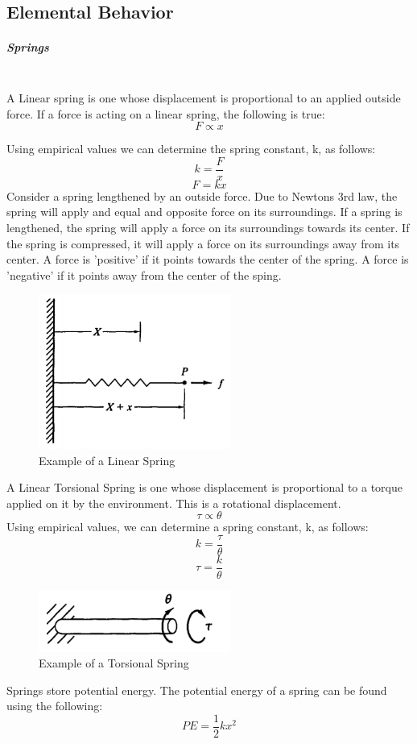 \documentclass[paper=a4, fontsize=11pt]{scrartcl} %
\numberwithin{equation}{section} %
\numberwithin{figure}{section} %
\numberwithin{table}{section} %
\begin{document}
\subsection{Elemental Behavior}

\subparagraph{Springs}~ \\
A Linear spring is one whose displacement is proportional to an applied outside force. If a force is acting on a linear spring, the following is true: 
$$F \propto x$$

Using empirical values we can determine the spring constant, k, as follows:
$$k = \frac{F}{x}$$
$$F = kx$$
Consider a spring lengthened by an outside force. Due to Newtons 3rd law, the spring will apply and equal and opposite force on its surroundings. If a spring is lengthened, the spring will apply a force on its surroundings towards its center. If the spring is compressed, it will apply a force on its surroundings away from its center. A force is 'positive' if it points towards the center of the spring. A force is 'negative' if it points away from the center of the sping.\\

\begin{figure}
\begin{center}
  \includegraphics[width=17em]{Linear_Spring_1.png}
  \caption{Example of a Linear Spring}
  \label{fig:boat1}
\end{center}
\end{figure}

A Linear Torsional Spring is one whose displacement is proportional to a torque applied on it by the environment. This is a rotational displacement. \\
$$\tau \propto \theta$$
Using empirical values, we can determine a spring constant, k, as follows:
$$k = \frac{\tau}{\theta}$$
$$\tau = \frac{k}{\theta}$$

\begin{figure}
\begin{center}
  \includegraphics[width=17em]{Torsional_Spring_1.png}
  \caption{Example of a Torsional Spring}
  \label{fig:boat1}
\end{center}
\end{figure}
Springs store potential energy. The potential energy of a spring can be found using the following: \\
$$PE = \frac{1}{2} kx^2$$
\end{document}
